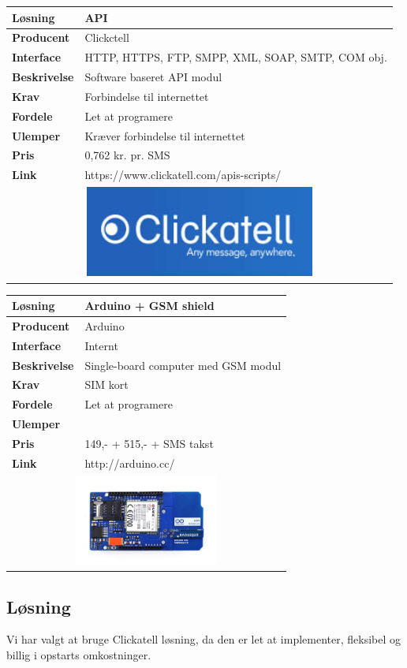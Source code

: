 \begin{table}[!htbp] \centering
	\label{tab:GSM2}
\begin{tabular}{|p{6cm}|p{8cm}|}
	\hline
		\textbf{Løsning}				&API \\ \hline
		\textbf{Producent} 			&Clickctell \\ \hline
		\textbf{Interface} 			&HTTP, HTTPS, FTP, SMPP, XML, SOAP, SMTP, COM obj.\\ \hline
		\textbf{Beskrivelse} 		&Software baseret API modul \\ \hline
		\textbf{Krav} 				&Forbindelse til internettet \\ \hline
		\textbf{Fordele}				&Let at programere \\ \hline
		\textbf{Ulemper} 			&Kræver forbindelse til internettet \\ \hline
		\textbf{Pris} 				&0,762 kr. pr. SMS \\ \hline
		\textbf{Link} 				&https://www.clickatell.com/apis-scripts/ \\ \hline	
		\multicolumn{2}{|c|}{
			\includegraphics[height=3cm]{billeder/GSM_Clickatell.jpg}} \\ \hline	
\end{tabular}
\end{table}

\begin{table}[!htbp] \centering
	\label{tab:GSM3}
\begin{tabular}{|p{6cm}|p{8cm}|}
	\hline
		\textbf{Løsning}				&Arduino + GSM shield \\ \hline
		\textbf{Producent} 			&Arduino \\ \hline
		\textbf{Interface} 			&Internt \\ \hline
		\textbf{Beskrivelse} 		&Single-board computer med GSM modul\\ \hline
		\textbf{Krav} 				&SIM kort \\ \hline
		\textbf{Fordele}				&Let at programere \\ \hline
		\textbf{Ulemper} 			&\\ \hline
		\textbf{Pris} 				&149,- + 515,- + SMS takst\\ \hline
		\textbf{Link} 				&http://arduino.cc/ \\ \hline		
		\multicolumn{2}{|c|}{
			\includegraphics[height=3cm]{billeder/GSM_Arduino.jpg}} \\ \hline	
\end{tabular}
\end{table}

\subsection{Løsning}
Vi har valgt at bruge Clickatell løsning, da den er let at implementer, fleksibel og billig i opstarts omkostninger.